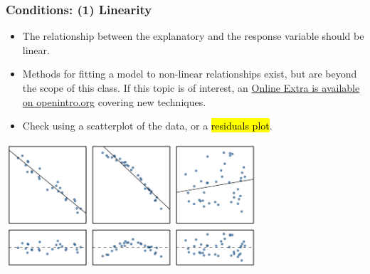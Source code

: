 \begin{frame}
\frametitle{Conditions: (1) Linearity}

\begin{itemize}

\item The relationship between the explanatory and the response variable should be linear. 

\pause

\item Methods for fitting a model to non-linear relationships exist, but are beyond the scope of this class. If this topic is of interest, an \href{http://www.openintro.org/download.php?file=os2_extra_nonlinear_relationships&referrer=/stat/textbook.php}{Online Extra is available on openintro.org} covering new techniques.

\pause

\item Check using a scatterplot of the data, or a \hl{residuals plot}.

\end{itemize}

\begin{center}
\includegraphics[width=0.7\textwidth]{8-2_least_square_reg/figures/sampleLinesAndResPlots/sampleLinesAndResPlots}
\end{center}

\end{frame}


